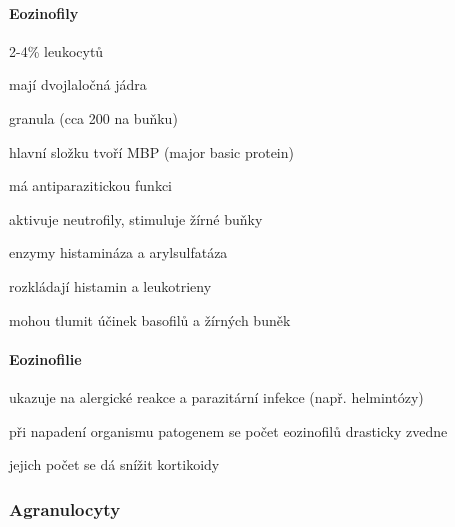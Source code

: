 \documentclass[DIV=8]{scrreprt}
\begin{document}
\paragraph{Eozinofily}
\begin{myItemize}[nosep]
    \item 2-4\% leukocytů
    \item mají dvojlaločná jádra
    \item granula (cca 200 na buňku)
\begin{myItemize}[nosep]
    \item hlavní složku tvoří MBP (major basic protein)
\begin{myItemize}[nosep]
    \item má antiparazitickou funkci
    \item aktivuje neutrofily, stimuluje žírné buňky
\end{myItemize}

    \item enzymy histamináza a arylsulfatáza
\begin{myItemize}[nosep]
    \item rozkládají histamin a leukotrieny
    \item mohou tlumit účinek basofilů a žírných buněk
\end{myItemize}

\end{myItemize}

\end{myItemize}



\paragraph{Eozinofilie}
\begin{myItemize}[nosep]
    \item ukazuje na  alergické reakce a parazitární infekce (např. helmintózy)
    \item při napadení organismu patogenem se počet eozinofilů drasticky zvedne
\begin{myItemize}[nosep]
    \item jejich počet se dá snížit kortikoidy
\end{myItemize}

\end{myItemize}



\subsubsection{Agranulocyty} \label{Agranulocyty}
\end{document}
